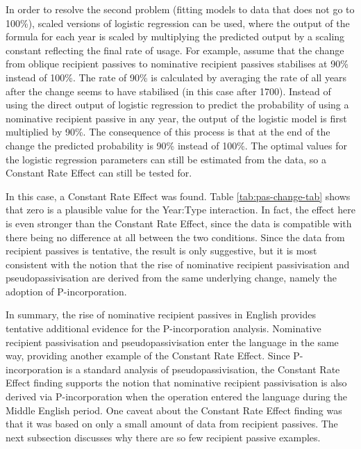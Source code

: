 	In order to resolve the second problem (fitting models to data that does not go to 100\%), scaled versions of logistic regression can be used, where the output of the formula for each year is scaled by multiplying the predicted output by a scaling constant reflecting the final rate of usage. For example, assume that the change from oblique recipient passives to nominative recipient passives stabilises at 90\% instead of 100\%. The rate of 90\% is calculated by averaging the rate of all years after the change seems to have stabilised (in this case after 1700). Instead of using the direct output of logistic regression to predict the probability of using a nominative recipient passive in any year, the output of the logistic model is first multiplied by 90\%. The consequence of this process is that at the end of the change the predicted probability is 90\% instead of 100\%. The optimal values for the logistic regression parameters can still be estimated from the data, so a Constant Rate Effect can still be tested for. 

	In this case, a Constant Rate Effect was found. Table \ref{tab:pas-change-tab} shows that zero is a plausible value for the Year:Type interaction. In fact, the effect here is even stronger than the Constant Rate Effect, since the data is compatible with there being no difference at all between the two conditions. Since the data from recipient passives is tentative, the result is only suggestive, but it is most consistent with the notion that the rise of nominative recipient passivisation and pseudopassivisation are derived from the same underlying change, namely the adoption of P-incorporation.



	In summary, the rise of nominative recipient passives in English provides tentative additional evidence for the P-incorporation analysis. Nominative recipient passivisation and pseudopassivisation enter the language in the same way, providing another example of the Constant Rate Effect. Since P-incorporation is a standard analysis of pseudopassivisation, the Constant Rate Effect finding supports the notion that nominative recipient passivisation is also derived via P-incorporation when the operation entered the language during the Middle English period. One caveat about the Constant Rate Effect finding was that it was based on only a small amount of data from recipient passives. The next subsection discusses why there are so few recipient passive examples.

